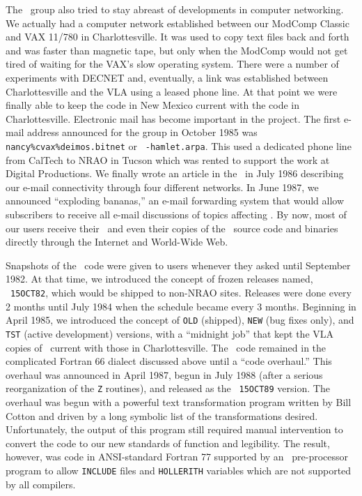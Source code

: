 The \AIPS\ group also tried to stay abreast of developments in
computer networking.  We actually had a computer network established
between our ModComp Classic and VAX 11/780 in Charlottesville.  It was
used to copy text files back and forth and was faster than magnetic
tape, but only when the ModComp would not get tired of waiting for the
VAX's slow operating system.  There were a number of experiments with
DECNET and, eventually, a link was established between Charlottesville
and the VLA using a leased phone line.  At that point we were finally
able to keep the code in New Mexico current with the code in
Charlottesville.  Electronic mail has become important in the
project.  The first e-mail address announced for the group in October
1985 was {\tt nancy\%cvax\%deimos\@caltech.bitnet} or {\tt
\@cit-hamlet.arpa}.  This used a dedicated phone line from CalTech to
NRAO in Tucson which was rented to support the work at Digital
Productions.  We finally wrote an article in the \Aipsletter\ in July
1986 describing our e-mail connectivity through four different
networks.  In June 1987, we announced ``exploding bananas,'' an e-mail
forwarding system that would allow subscribers to receive all e-mail
discussions of topics affecting \hbox{\AIPS}.  By now, most of our
users receive their \Aipsletter\ and even their copies of the \AIPS\
source code and binaries directly through the Internet and World-Wide
Web.

Snapshots of the \AIPS\ code were given to users whenever they asked
until September 1982.  At that time, we introduced the concept of
frozen releases named, \eg\ {\tt 15OCT82}, which would be shipped to
non-NRAO sites.  Releases were done every 2 months until July 1984 when
the schedule became every 3 months.  Beginning in April 1985, we
introduced the concept of {\tt OLD} (shipped), {\tt NEW} (bug fixes
only), and {\tt TST} (active development) versions, with a ``midnight
job'' that kept the VLA copies of \AIPS\ current with those in
Charlottesville.  The \AIPS\ code remained in the complicated Fortran
66 dialect discussed above until a ``code overhaul.''  This overhaul
was announced in April 1987, begun in July 1988 (after a serious
reorganization of the {\tt Z} routines), and released as the {\tt
15OCT89} version.  The overhaul was begun with a powerful text
transformation program written by Bill Cotton and driven by a long
symbolic list of the transformations desired.  Unfortunately, the
output of this program still required manual intervention to convert
the code to our new standards of function and legibility.  The result,
however, was code in ANSI-standard Fortran 77 supported by an \AIPS\
pre-processor program to allow {\tt INCLUDE} files and {\tt HOLLERITH}
variables which are not supported by all compilers.

